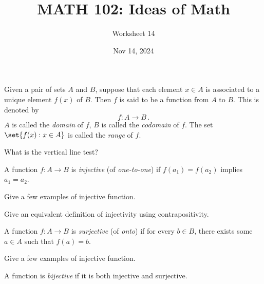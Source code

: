 \documentclass[12pt]{amsart}
\title{ MATH 102: Ideas  of Math }
\author{ Worksheet 14 }
\date{Nov 14, 2024}
\begin{document}
\maketitle

\begin{definition}
	Given a pair of sets $A$ and $B$, suppose that each element $x\in A$ is
	associated to a unique element $f(x)$ of $B$.
	Then $f$ is said to be a function from $A$ to $B$.
	This is denoted by
	\begin{equation*}
		f: A\to B \,.
	\end{equation*}
	$A$ is called the \emph{domain} of $f$, $B$ is called the \emph{codomain}
	of $f$.
	The set $\set{ f(x): x\in A  }$ is called the \emph{range} of $f$.
\end{definition}

\begin{question}
	What is the vertical line test?
\end{question}

\vspace{5cm}

\begin{definition}
	A function $f:A \to B$ is \emph{injective} (of \emph{one-to-one}) if
	$f(a_1) = f(a_2)$ implies $a_1 = a_2$.
\end{definition}

\begin{question}
	Give a few examples of  injective function.
\end{question}
\vspace{5cm}

\begin{question}
	Give an equivalent definition of injectivity using contrapositivity.
\end{question}

\begin{definition}
	A function $f:A \to B$ is \emph{surjective} (of \emph{onto}) if
	for every $b\in B$, there exists some $a\in A$ such that $f(a) = b$.
\end{definition}

\begin{question}
	Give a few examples of  injective function.
\end{question}
\vspace{5cm}

\begin{definition}
	A function is \emph{bijective} if it is both injective and surjective.
\end{definition}
\end{document}
